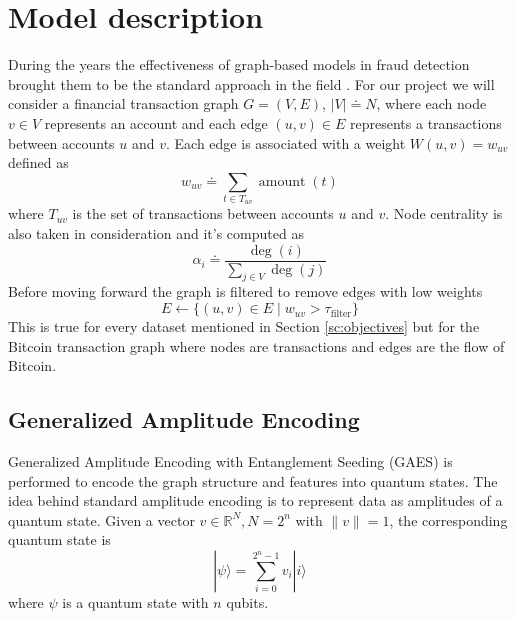 \chapter{Model description}
During the years the effectiveness of graph-based models in fraud detection brought them to be the standard approach in the field \cite{artgrafi}.
For our project we will consider a financial transaction graph $G = (V, E)$, \(|V| \doteq N\), where each node $v \in V$ represents an account and each edge $(u, v) \in E$ represents a transactions between accounts $u$ and $v$. Each edge is associated with a weight $W(u,v) = w_{uv}$ defined as
\begin{equation}
    w_{uv} \doteq \sum_{t \in T_{uv}} \operatorname{amount}(t)
\end{equation}
where $T_{uv}$ is the set of transactions between accounts $u$ and $v$. Node centrality is also taken in consideration and it's computed as
\begin{equation}
    \alpha_{i} \doteq \frac{\operatorname{deg}(i)}{\sum_{j\in V}\operatorname{deg}(j)}
\end{equation}
Before moving forward the graph is filtered to remove edges with low weights
\begin{equation}
    E \leftarrow \{(u,v) \in E \; | \; w_{uv} > \tau_\text{filter}\}
\end{equation}
This is true for every dataset mentioned in Section \ref{sc:objectives} but for the Bitcoin transaction graph where nodes are transactions and edges are the flow of Bitcoin.

\section{Generalized Amplitude Encoding}
Generalized Amplitude Encoding with Entanglement Seeding (GAES) is performed to encode the graph structure and features into quantum states.
The idea behind standard amplitude encoding is to represent data as amplitudes of a quantum state. Given a vector \(v \in \mathbb{R}^{N}, N=2^n\) with \(\|v\| = 1\), the corresponding quantum state is
\begin{equation}
    |\psi\rangle = \sum_{i=0}^{2^n-1} v_i |i\rangle
\end{equation}
where \(\psi\) is a quantum state with \(n\) qubits.

